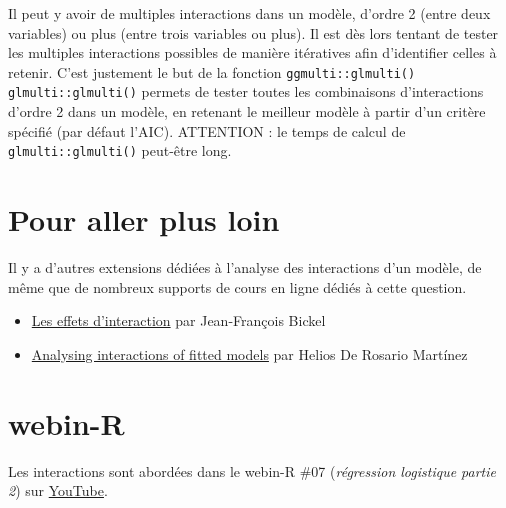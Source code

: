 \documentclass[
  letterpaper,
  DIV=11,
  numbers=noendperiod,
  oneside]{scrreprt}
\providecommand{\tightlist}{%
  \setlength{\itemsep}{0pt}\setlength{\parskip}{0pt}}\usepackage{longtable,booktabs,array}
\begin{document}
\begin{tcolorbox}[enhanced jigsaw, colbacktitle=quarto-callout-tip-color!10!white, opacityback=0, toprule=.15mm, colback=white, coltitle=black, bottomtitle=1mm, toptitle=1mm, titlerule=0mm, rightrule=.15mm, title=\textcolor{quarto-callout-tip-color}{\faLightbulb}\hspace{0.5em}{Astuce}, breakable, bottomrule=.15mm, opacitybacktitle=0.6, arc=.35mm, left=2mm, leftrule=.75mm, colframe=quarto-callout-tip-color-frame]

Il peut y avoir de multiples interactions dans un modèle, d'ordre 2
(entre deux variables) ou plus (entre trois variables ou plus). Il est
dès lors tentant de tester les multiples interactions possibles de
manière itératives afin d'identifier celles à retenir. C'est justement
le but de la fonction \texttt{ggmulti::glmulti()}
\texttt{glmulti::glmulti()} permets de tester toutes les combinaisons
d'interactions d'ordre 2 dans un modèle, en retenant le meilleur modèle
à partir d'un critère spécifié (par défaut l'AIC). ATTENTION : le temps
de calcul de \texttt{glmulti::glmulti()} peut-être long.

\end{tcolorbox}

\hypertarget{pour-aller-plus-loin}{%
\section{Pour aller plus loin}\label{pour-aller-plus-loin}}

Il y a d'autres extensions dédiées à l'analyse des interactions d'un
modèle, de même que de nombreux supports de cours en ligne dédiés à
cette question.

\begin{itemize}
\tightlist
\item
  \href{http://commonweb.unifr.ch/artsdean/pub/gestens/f/as/files/4665/9547_131825.pdf}{Les
  effets d'interaction} par Jean-François Bickel
\item
  \href{https://cran.r-project.org/web/packages/phia/vignettes/phia.pdf}{Analysing
  interactions of fitted models} par Helios De Rosario Martínez
\end{itemize}

\hypertarget{webin-r-8}{%
\section{webin-R}\label{webin-r-8}}

Les interactions sont abordées dans le webin-R \#07 (\emph{régression
logistique partie 2}) sur
\href{https://youtu.be/BUo9i7XTLYQ?t=2750}{YouTube}.
\end{document}
